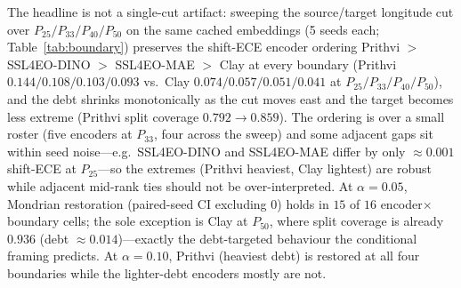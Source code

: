 \documentclass[journal]{IEEEtran}
\renewcommand{\_}{\textunderscore\allowbreak}
\begin{document}
The headline is not a single-cut artifact: sweeping the source/target
longitude cut over $P_{25}/P_{33}/P_{40}/P_{50}$ on the same cached embeddings (5 seeds each;
Table~\ref{tab:boundary}) preserves the shift-ECE encoder ordering Prithvi $>$ SSL4EO-DINO $>$ SSL4EO-MAE
$>$ Clay at every boundary (Prithvi $0.144/0.108/0.103/0.093$ vs.\ Clay $0.074/0.057/0.051/0.041$ at
$P_{25}/P_{33}/P_{40}/P_{50}$), and the debt shrinks monotonically as the cut moves east and the target
becomes less extreme (Prithvi split coverage $0.792\to0.859$). The ordering is over a small roster (five
encoders at $P_{33}$, four across the sweep) and some adjacent gaps sit within seed noise---e.g.\ SSL4EO-DINO
and SSL4EO-MAE differ by only ${\approx}0.001$ shift-ECE at $P_{25}$---so the extremes (Prithvi heaviest, Clay
lightest) are robust while adjacent mid-rank ties should not be over-interpreted. At $\alpha=0.05$, Mondrian restoration
(paired-seed CI excluding $0$) holds in $15$ of $16$ encoder$\times$boundary cells; the sole exception is
Clay at $P_{50}$, where split coverage is already $0.936$ (debt ${\approx}0.014$)---exactly the
debt-targeted behaviour the conditional framing predicts. At $\alpha=0.10$, Prithvi (heaviest debt) is
restored at all four boundaries while the lighter-debt encoders mostly are not.
\end{document}

